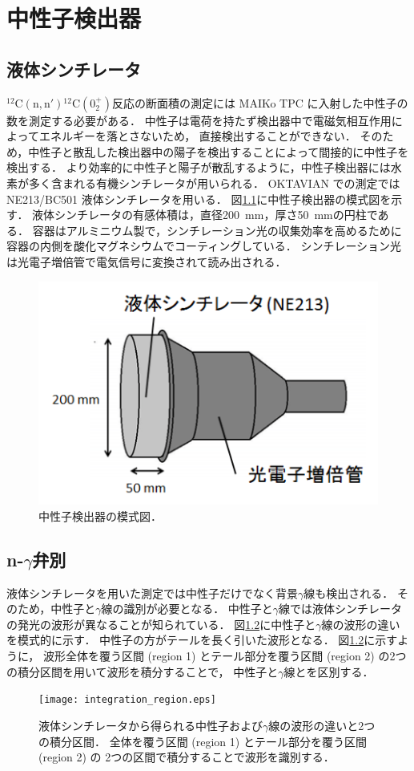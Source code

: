 \documentclass[../master]{subfiles}
\begin{document}
\chapter{中性子検出器}
\section{液体シンチレータ}
${}^{12}\mathrm{C}(\mathrm{n},\mathrm{n}'){}^{12}\mathrm{C} (0_2^+)$反応の断面積の測定には
MAIKo TPC に入射した中性子の数を測定する必要がある．
中性子は電荷を持たず検出器中で電磁気相互作用によってエネルギーを落とさないため，
直接検出することができない．
そのため，中性子と散乱した検出器中の陽子を検出することによって間接的に中性子を検出する．
より効率的に中性子と陽子が散乱するように，中性子検出器には水素が多く含まれる有機シンチレータが用いられる．
OKTAVIAN での測定ではNE213/BC501 液体シンチレータを用いる．
図\ref{fig::neutron_detector}に中性子検出器の模式図を示す．
液体シンチレータの有感体積は，直径\SI{200}{\milli\metre}，厚さ\SI{50}{\milli\metre}の円柱である．
容器はアルミニウム製で，シンチレーション光の収集効率を高めるために容器の内側を酸化マグネシウムでコーティングしている．
シンチレーション光は光電子増倍管で電気信号に変換されて読み出される．
\begin{figure}
  \centering
  \includegraphics[clip, width=0.6\columnwidth]{pic/neutron_detector.png}
  \caption{中性子検出器の模式図．}
  \label{fig::neutron_detector}
\end{figure}

\section{n-\texorpdfstring{$\gamma$}{gamma}弁別}
液体シンチレータを用いた測定では中性子だけでなく背景$\gamma$線も検出される．
そのため，中性子と$\gamma$線の識別が必要となる．
中性子と$\gamma$線では液体シンチレータの発光の波形が異なることが知られている．
図\ref{fig::pulse_shape_n_gamma}に中性子と$\gamma$線の波形の違いを模式的に示す．
中性子の方がテールを長く引いた波形となる．
図\ref{fig::pulse_shape_n_gamma}に示すように，
波形全体を覆う区間 (region 1) とテール部分を覆う区間 (region 2) の2つの積分区間を用いて波形を積分することで，
中性子と$\gamma$線とを区別する．
\begin{figure}
  \centering
  \texttt{[image: integration\_region.eps]}
  \caption[液体シンチレータから得られる中性子および$\gamma$線の波形の違いと2つの積分区間．]
          {液体シンチレータから得られる中性子および$\gamma$線の波形の違いと2つの積分区間．
            全体を覆う区間 (region 1) とテール部分を覆う区間 (region 2) の
            2つの区間で積分することで波形を識別する．
          }
  \label{fig::pulse_shape_n_gamma} 
\end{figure}
\end{document}
